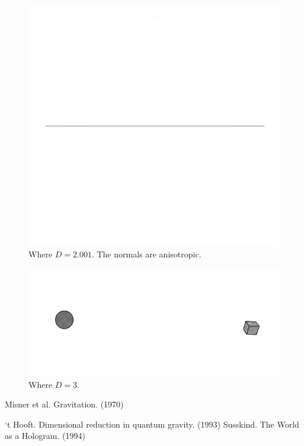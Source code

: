 \documentclass[12pt]{article}
\begin{document}
\begin{figure} 
\centering
\label{fig3}
  \includegraphics[width = 3 in]{2.001.png}
  \caption{
Where $D = 2.001$.
The normals are anisotropic.
}
\end{figure}


\begin{figure} 
\centering
\label{fig4}
  \includegraphics[width = 5 in]{AABB.png}
  \caption{
Where $D = 3$.
}
\end{figure}












\begin{thebibliography}{9}

 Misner et al. Gravitation. (1970)

 `t Hooft. Dimensional reduction in quantum gravity. (1993)
 Susskind. The World as a Hologram. (1994)








\end{thebibliography}
\end{document}
